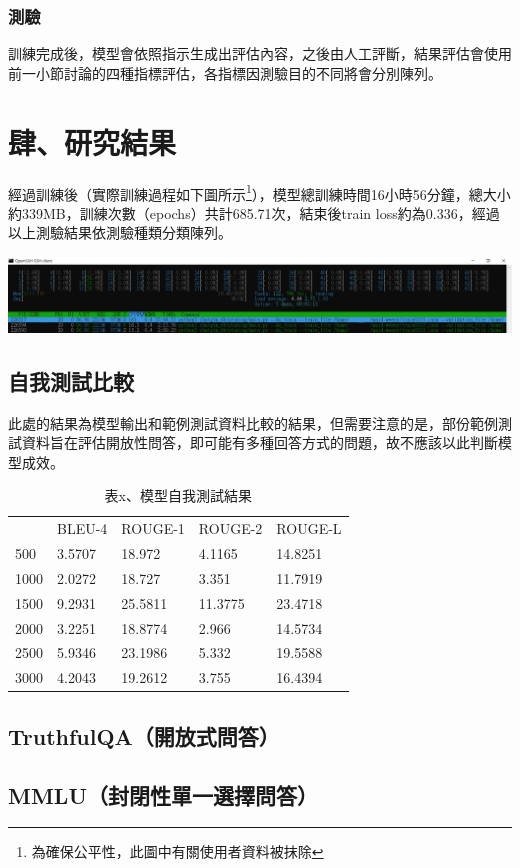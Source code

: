 \documentclass[8pt,a4paper,新細明體,UTF8,natbib]{article}
\begin{document}
\begin{CJK*}{UTF8}{bsmi}
	\subsubsection{測驗}
	訓練完成後，模型會依照指示生成出評估內容，之後由人工評斷，結果評估會使用前一小節討論的四種指標評估，各指標因測驗目的不同將會分別陳列。
	\section{肆、研究結果}
	經過訓練後（實際訓練過程如下圖所示\footnote{為確保公平性，此圖中有關使用者資料被抹除}），模型總訓練時間16小時56分鐘，總大小約339MB，訓練次數（epochs）共計685.71次，結束後train loss約為0.336，經過以上測驗結果依測驗種類分類陳列。%
	
	\includegraphics[width=\textwidth]{running}
	\subsection{自我測試比較}
	此處的結果為模型輸出和範例測試資料比較的結果，但需要注意的是，部份範例測試資料旨在評估開放性問答，即可能有多種回答方式的問題，故不應該以此判斷模型成效。
	\begin{table}[H]
		\centering
		\caption{表x、模型自我測試結果}
		\begin{tabular}{lllll}
			& BLEU-4 & ROUGE-1 & ROUGE-2 & ROUGE-L  \\
			500  & 3.5707 & 18.972  & 4.1165  & 14.8251  \\
			1000 & 2.0272 & 18.727  & 3.351   & 11.7919  \\
			1500 & 9.2931 & 25.5811 & 11.3775 & 23.4718  \\
			2000 & 3.2251 & 18.8774 & 2.966   & 14.5734  \\
			2500 & 5.9346 & 23.1986 & 5.332   & 19.5588  \\
			3000 & 4.2043 & 19.2612 & 3.755   & 16.4394 
		\end{tabular}
	\end{table}
	\subsection{TruthfulQA（開放式問答）}
	\subsection{MMLU（封閉性單一選擇問答）}

\end{CJK*}
\end{document}
